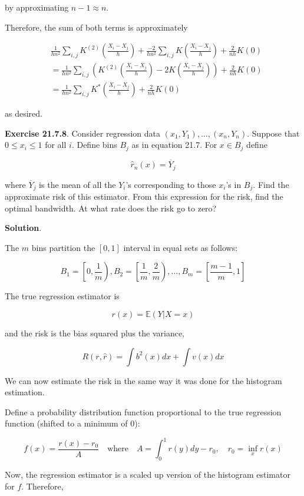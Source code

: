 by approximating \(n - 1 \approx n\).

Therefore, the sum of both terms is approximately

\[
\begin{align}
&\frac{1}{hn^2} \sum_{i, j} K^{(2)} \left(\frac{X_i - X_j}{h} \right) + \frac{-2}{h n^2} \sum_{i, j} K \left( \frac{X_i - X_j}{h} \right)
+ \frac{2}{nh} K(0) \\
&= \frac{1}{hn^2} \sum_{i, j} \left( K^{(2)} \left(\frac{X_i - X_j}{h} \right) - 2 K \left( \frac{X_i - X_j}{h} \right) \right) + \frac{2}{nh} K(0) \\
&= \frac{1}{hn^2} \sum_{i, j} K^* \left(\frac{X_i - X_j}{h} \right) + \frac{2}{nh} K(0)
\end{align}
\]

as desired.

\textbf{Exercise 21.7.8}. Consider regression data
\((x_1, Y_1), \dots, (x_n, Y_n)\). Suppose that \(0 \leq x_i \leq 1\)
for all \(i\). Define bins \(B_j\) as in equation 21.7. For
\(x \in B_j\) define

\[ \hat{r}_n(x) = \overline{Y}_j \]

where \(\overline{Y}_j\) is the mean of all the \(Y_i\)'s corresponding
to those \(x_i\)'s in \(B_j\). Find the approximate risk of this
estimator. From this expression for the risk, find the optimal
bandwidth. At what rate does the risk go to zero?

\textbf{Solution}.

The \(m\) bins partition the \([0, 1]\) interval in equal sets as
follows:

\[ B_1 = \left[0, \frac{1}{m} \right), B_2 = \left[\frac{1}{m}, \frac{2}{m} \right), \dots, B_m = \left[\frac{m - 1}{m}, 1 \right] \]

The true regression estimator is

\[ r(x) = \mathbb{E}(Y | X = x) \]

and the risk is the bias squared plus the variance,

\[ R(r, \hat{r}) = \int b^2(x) dx + \int v(x) dx\]

We can now estimate the risk in the same way it was done for the
histogram estimation.

Define a probability distribution function proportional to the true
regression function (shifted to a minimum of 0):

\[ f(x) = \frac{r(x) - r_0}{A} \quad \text{where} \quad A = \int_0^1 r(y) dy - r_0, \quad r_0 = \inf_x r(x) \]

Now, the regression estimator is a scaled up version of the histogram
estimator for \(f\). Therefore,

